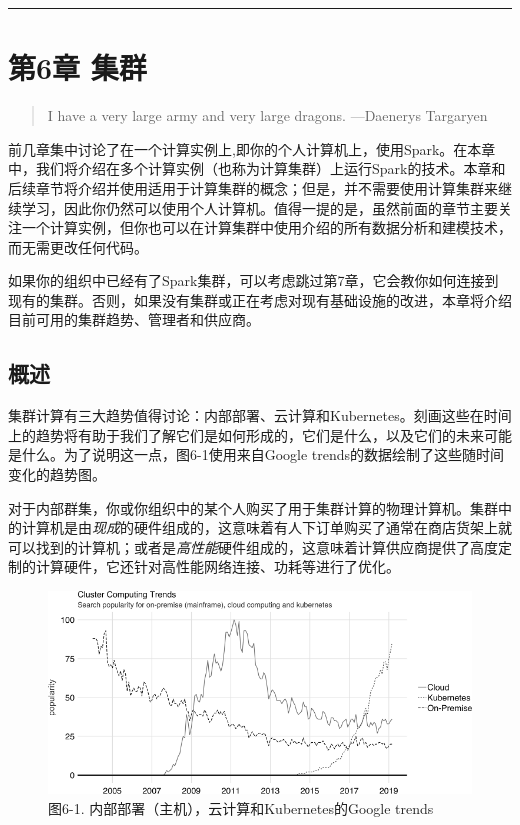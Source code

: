 \documentclass[
]{article}
\begin{document}
\begin{center}\rule{0.5\linewidth}{\linethickness}\end{center}

\hypertarget{ux7b2c6ux7ae0-ux96c6ux7fa4}{%
\section{第6章 集群}\label{ux7b2c6ux7ae0-ux96c6ux7fa4}}

\begin{quote}
I have a very large army and very large dragons. ---Daenerys Targaryen
\end{quote}

前几章集中讨论了在一个计算实例上,即你的个人计算机上，使用Spark。在本章中，我们将介绍在多个计算实例（也称为计算集群）上运行Spark的技术。本章和后续章节将介绍并使用适用于计算集群的概念；但是，并不需要使用计算集群来继续学习，因此你仍然可以使用个人计算机。值得一提的是，虽然前面的章节主要关注一个计算实例，但你也可以在计算集群中使用介绍的所有数据分析和建模技术，而无需更改任何代码。

如果你的组织中已经有了Spark集群，可以考虑跳过第7章，它会教你如何连接到现有的集群。否则，如果没有集群或正在考虑对现有基础设施的改进，本章将介绍目前可用的集群趋势、管理者和供应商。

\hypertarget{ux6982ux8ff0-5}{%
\subsection{概述}\label{ux6982ux8ff0-5}}

集群计算有三大趋势值得讨论：内部部署、云计算和Kubernetes。刻画这些在时间上的趋势将有助于我们了解它们是如何形成的，它们是什么，以及它们的未来可能是什么。为了说明这一点，图6-1使用来自Google
trends的数据绘制了这些随时间变化的趋势图。

对于内部群集，你或你组织中的某个人购买了用于集群计算的物理计算机。集群中的计算机是由\emph{现成}的硬件组成的，这意味着有人下订单购买了通常在商店货架上就可以找到的计算机；或者是\emph{高性能}硬件组成的，这意味着计算供应商提供了高度定制的计算硬件，它还针对高性能网络连接、功耗等进行了优化。

\begin{figure}
\centering
\includegraphics{figures/6_1.png}
\caption{图6-1. 内部部署（主机），云计算和Kubernetes的Google trends}
\end{figure}
\end{document}
